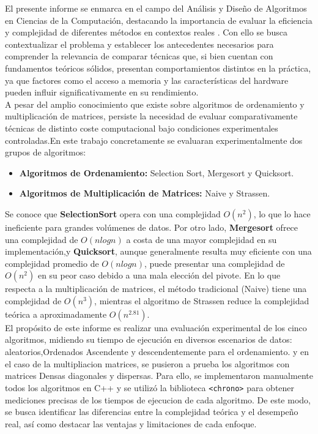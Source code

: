 El presente informe se enmarca en el campo del Análisis y Diseño de Algoritmos en Ciencias de la Computación, destacando la importancia de evaluar la eficiencia y complejidad de diferentes métodos en contextos reales \cite{GoodScientificPaper}. Con ello se busca contextualizar el problema y establecer los antecedentes necesarios para comprender la relevancia de comparar técnicas que, si bien cuentan con fundamentos teóricos sólidos, presentan comportamientos distintos en la práctica, ya que factores como el acceso a memoria y las características del hardware pueden influir significativamente en su rendimiento.\\

A pesar del amplio conocimiento que existe sobre algoritmos de ordenamiento y multiplicación de matrices, persiste la necesidad de evaluar comparativamente técnicas de distinto coste computacional bajo condiciones experimentales controladas.En este trabajo concretamente se evaluaran experimentalmente dos grupos de algoritmos:
\begin{itemize} \item \textbf{Algoritmos de Ordenamiento:} Selection Sort, Mergesort y Quicksort.
\item \textbf{Algoritmos de Multiplicación de Matrices:} Naive y Strassen. \end{itemize}

Se conoce que \textbf{SelectionSort} opera con una complejidad $O(n^2)$, lo que lo hace ineficiente para grandes volúmenes de datos. Por otro lado, \textbf{Mergesort} ofrece una complejidad de 
$O(nlogn)$ a costa de una mayor complejidad en su implementación,y \textbf{Quicksort}, aunque generalmente resulta muy eficiente con una complejidad promedio de $O(nlogn)$, puede presentar una complejidad de $O(n^2)$ en su peor caso debido a una mala elección del pivote. En lo que respecta a la multiplicación de matrices, el método tradicional (Naive) tiene una complejidad de
$O(n^3)$, mientras el algoritmo de Strassen reduce la complejidad teórica a aproximadamente
$O(n^{2.81}).$\\

El propósito de este informe es realizar una evaluación experimental de los cinco algoritmos, midiendo su tiempo de ejecución en diversos escenarios de datos: aleatorios,Ordenados Ascendente y descendentemente para el ordenamiento. y en el caso de la multipliacion matrices, se pusieron a prueba los algoritmos con matrices Densas diagonales y dispersas. Para ello, se implementaron manualmente todos los algoritmos en C++ y se utilizó la biblioteca \texttt{<chrono>} para obtener mediciones precisas de los tiempos de ejecucion de cada algoritmo. De este modo, se busca identificar las diferencias entre la complejidad teórica y el desempeño real, así como destacar las ventajas y limitaciones de cada enfoque.